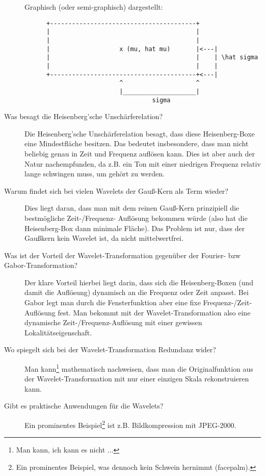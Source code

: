 \begin{description}
    Graphisch (oder semi-graphisch) dargestellt:

    \begin{lstlisting}
      +----------------------------------------+
      |                                        |
      |                                        |
      |                   x (mu, hat mu)       |<---|
      |                                        |    | \hat sigma
      |                                        |    |
      +----------------------------------------+<---|
                          ^                    ^
                          |____________________|
                                   sigma
    \end{lstlisting}
  \item[Was besagt die Heisenberg'sche Unschärferelation?]
    Die Heisenberg'sche Unschärferelation besagt, dass diese Heisenberg-Boxe eine Mindestfläche
    besitzen. Das bedeutet insbesondere, dass man nicht beliebig genau in Zeit und Frequenz auflösen
    kann. Dies ist aber auch der Natur nachempfunden, da z.B. ein Ton mit einer niedrigen Frequenz
    relativ lange schwingen muss, um gehört zu werden.
  \item[Warum findet sich bei vielen Wavelets der Gauß-Kern als Term wieder?]
    Dies liegt daran, dass man mit dem reinen Gauß-Kern prinzipiell die bestmögliche Zeit-/Frequenz-
    Auflösung bekommen würde (also hat die Heisenberg-Box dann minimale Fläche). Das Problem ist nur,
    dass der Gaußkern kein Wavelet ist, da nicht mittelwertfrei.
  \item[Was ist der Vorteil der Wavelet-Transformation gegenüber der Fourier- bzw Gabor-Transformation?]
    Der klare Vorteil hierbei liegt darin, dass sich die Heisenberg-Boxen (und damit die Auflösung)
    dynamisch an die Frequenz oder Zeit anpasst. Bei Gabor legt man durch die Fensterfunktion aber eine
    fixe Frequenz-/Zeit-Auflösung fest. Man bekommt mit der Wavelet-Transformation also eine dynamische
    Zeit-/Frequenz-Auflösung mit einer gewissen Lokalitätseigenschaft.
  \item[Wo spiegelt sich bei der Wavelet-Transformation Redundanz wider?]
    Man kann\footnote{Man kann, ich kann es nicht ...} mathematisch nachweisen, dass man die Originalfunktion
    aus der Wavelet-Transformation mit nur einer einzigen Skala rekonstruieren kann.
  \item[Gibt es praktische Anwendungen für die Wavelets?]
    Ein prominentes Beispiel\footnote{Ein prominentes Beispiel, was dennoch kein Schwein hernimmt (facepalm).}
    ist z.B. Bildkompression mit JPEG-2000.
\end{description}


